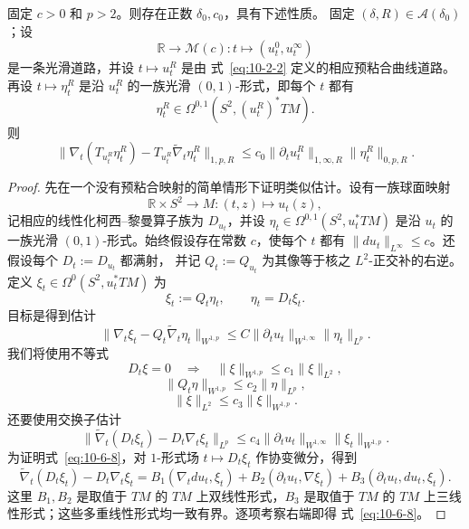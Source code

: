 \begin{lemma}\label{lem:10-6-2}
固定 $c>0$ 和 $p>2$。则存在正数 $\delta_0,c_0$，具有下述性质。
固定 $(\delta,R)\in\mathcal A(\delta_0)$；设
\[
  \mathbb R\longrightarrow\mathcal M(c):
  t\longmapsto(u_t^0,u_t^\infty)
\]
是一条光滑道路，并设 $t\mapsto u_t^R$ 是由
式~\eqref{eq:10-2-2} 定义的相应预粘合曲线道路。再设
$t\mapsto\eta_t^R$ 是沿 $u_t^R$ 的一族光滑 $(0,1)$-形式，即每个 $t$ 都有
\[
  \eta_t^R\in\Omega^{0,1}(S^2,(u_t^R)^*TM).
\]
则
\[
  \bigl\|\nabla_t(T_{u_t^R}\eta_t^R)
    -T_{u_t^R}\widetilde\nabla_t\eta_t^R\bigr\|_{1,p,R}
  \le c_0\|\partial_tu_t^R\|_{1,\infty,R}
         \|\eta_t^R\|_{0,p,R}.
\]
\end{lemma}

\begin{proof}
先在一个没有预粘合映射的简单情形下证明类似估计。设有一族球面映射
\[
  \mathbb R\times S^2\longrightarrow M:(t,z)\longmapsto u_t(z),
\]
记相应的线性化柯西--黎曼算子族为 $D_{u_t}$，并设
$\eta_t\in\Omega^{0,1}(S^2,u_t^*TM)$ 是沿 $u_t$ 的一族光滑
$(0,1)$-形式。始终假设存在常数 $c$，使每个 $t$ 都有
$\|du_t\|_{L^\infty}\le c$。还假设每个 $D_t:=D_{u_t}$ 都满射，
并记 $Q_t:=Q_{u_t}$ 为其像等于核之 $L^2$-正交补的右逆。定义
$\xi_t\in\Omega^0(S^2,u_t^*TM)$ 为
\[
  \xi_t:=Q_t\eta_t,
  \qquad \eta_t=D_t\xi_t.
\]
目标是得到估计
\begin{equation}\label{eq:10-6-4}
  \|\nabla_t\xi_t-Q_t\widetilde\nabla_t\eta_t\|_{W^{1,p}}
  \le C\|\partial_tu_t\|_{W^{1,\infty}}\|\eta_t\|_{L^p}.
\end{equation}
我们将使用不等式
\begin{equation}\label{eq:10-6-5}
  D_t\xi=0\quad\Longrightarrow\quad
  \|\xi\|_{W^{1,p}}\le c_1\|\xi\|_{L^2},
\end{equation}
\begin{equation}\label{eq:10-6-6}
  \|Q_t\eta\|_{W^{1,p}}\le c_2\|\eta\|_{L^p},
\end{equation}
\begin{equation}\label{eq:10-6-7}
  \|\xi\|_{L^2}\le c_3\|\xi\|_{W^{1,p}}.
\end{equation}
还要使用交换子估计
\begin{equation}\label{eq:10-6-8}
  \|\widetilde\nabla_t(D_t\xi_t)-D_t\nabla_t\xi_t\|_{L^p}
  \le c_4\|\partial_tu_t\|_{W^{1,\infty}}
          \|\xi_t\|_{W^{1,p}}.
\end{equation}
为证明式~\eqref{eq:10-6-8}，对 $1$-形式场
$t\mapsto D_t\xi_t$ 作协变微分，得到
\[
  \widetilde\nabla_t(D_t\xi_t)-D_t\nabla_t\xi_t
  =B_1(\nabla_tdu_t,\xi_t)
   +B_2(\partial_tu_t,\nabla\xi_t)
   +B_3(\partial_tu_t,du_t,\xi_t).
\]
这里 $B_1,B_2$ 是取值于 $TM$ 的 $TM$ 上双线性形式，$B_3$ 是取值于
$TM$ 的 $TM$ 上三线性形式；这些多重线性形式均一致有界。逐项考察右端即得
式~\eqref{eq:10-6-8}。


\end{proof}
